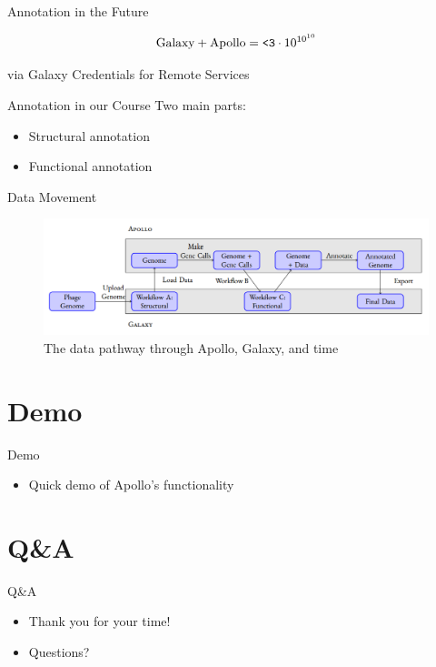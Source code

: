 \documentclass[12pt]{beamer}
\begin{document}
\begin{frame}{Annotation in the Future}
    \begin{theorem}
        \begin{equation}
            \text{Galaxy} + \text{Apollo} = \text{\texttt{<3}}\cdot10^{10^{10}}
        \end{equation}
    \end{theorem}
    via Galaxy Credentials for Remote Services
\end{frame}

\begin{frame}{Annotation in our Course}
    Two main parts:
    \begin{itemize}
        \item Structural annotation
        \item Functional annotation
    \end{itemize}
\end{frame}

\begin{frame}{Data Movement}
    \begin{figure}[!hb]
        \centering
        \includegraphics[width=\textwidth]{./ga.png}
        \caption{The data pathway through Apollo, Galaxy, and time}
    \end{figure}
\end{frame}


\section{Demo}
\begin{frame}{Demo}
    \begin{itemize}
        \item Quick demo of Apollo's functionality
    \end{itemize}
\end{frame}


\section{Q\&A}
\begin{frame}{Q\&A}
    \begin{itemize}
        \item Thank you for your time!
        \item Questions?
    \end{itemize}
\end{frame}
\end{document}
